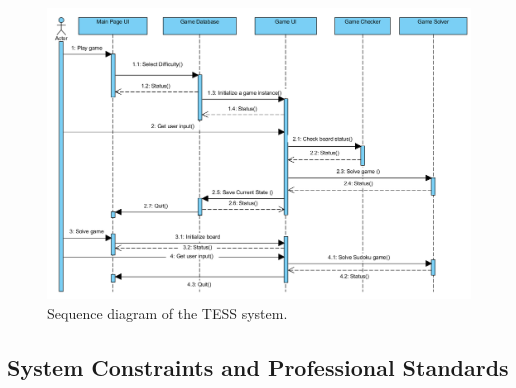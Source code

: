 \documentclass{article}
\begin{document}
\begin{figure}[ht]
	\centering
	\includegraphics[width=5.0in]{./Figure/Sequence_Diagram.PNG}
	\caption{Sequence diagram of the TESS system.\cite{UMLDoc}}
	\label{fig:sequencediagram}
\end{figure}

\subsection{System Constraints and Professional Standards}
\end{document}
